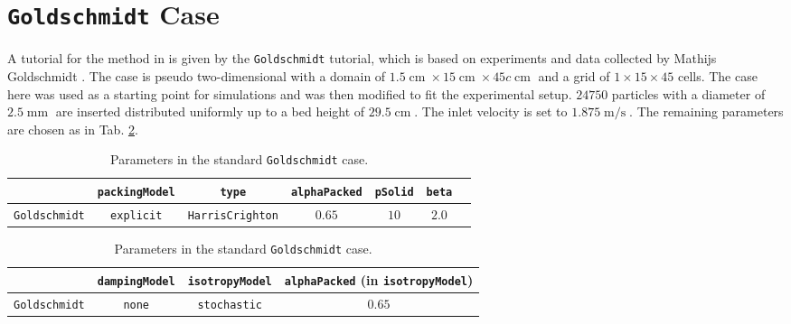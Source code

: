 \section{\lstinline|Goldschmidt| Case}
\label{sec:goldschmidt}
A tutorial for the \MP method in \OF is given by the \lstinline|Goldschmidt| tutorial, which is based on experiments and data collected by Mathijs Goldschmidt \cite{standardGoldschmidt}.
The case is pseudo two-dimensional with a domain of $1.5 \operatorname{cm} \times 15 \operatorname{cm} \times 45c \operatorname{cm}$ and a grid of $1 \times 15 \times 45$ cells.
The case here was used as a starting point for simulations and was then modified to fit the experimental setup.
$24750$ particles with a diameter of $2.5 \operatorname{mm}$ are inserted distributed uniformly up to a bed height of $29.5 \operatorname{cm}$.
The inlet velocity is set to $1.875 \operatorname{m/s}$.
The remaining parameters are chosen as in Tab. \ref{tab:goldschmidt}.
\begin{table}[h]
    \centering
    \begin{tabular}{c|c c c c c c}
         & \lstinline|packingModel| & \lstinline|type| & \lstinline|alphaPacked| & \lstinline|pSolid| & \lstinline|beta| \\
         \hline
         \lstinline|Goldschmidt|& \texttt{explicit} & \lstinline|HarrisCrighton| & $0.65$ & $10$ & $2.0$ 
    \end{tabular}
    \vspace{0.35cm}
    
    \begin{tabular}{c|c c c}
         & \lstinline|dampingModel| & \lstinline|isotropyModel| & \lstinline|alphaPacked| (in \lstinline|isotropyModel|) \\
         \hline
         \lstinline|Goldschmidt|& \lstinline|none| & \lstinline|stochastic| & $0.65$
    \end{tabular}
    \caption{Parameters in the standard \lstinline|Goldschmidt| case.}
    \label{tab:goldschmidt}
\end{table}


